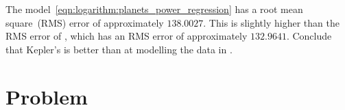 \documentclass[a4paper,oneside,12pt]{article}
\begin{document}
{\begin{solution}
The model~\eqref{eqn:logarithm:planets_power_regression} has a root
mean square~(RMS) error of approximately $138.0027$.  This is slightly
higher than the RMS error of
, which has an RMS
error of approximately $132.9641$.  Conclude that Kepler's
 is better than
 at modelling the
data in .
\end{solution}
}{}


\newpage

\section*{Problem}
\end{document}
